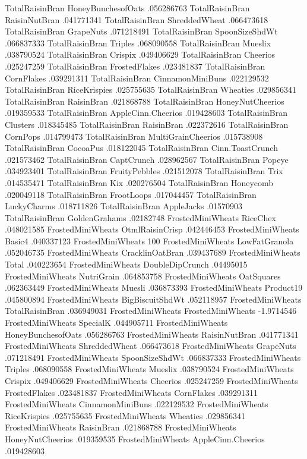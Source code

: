 TotalRaisinBran	HoneyBunchesofOats	.056286763
TotalRaisinBran	RaisinNutBran	.041771341
TotalRaisinBran	ShreddedWheat	.066473618
TotalRaisinBran	GrapeNuts	.071218491
TotalRaisinBran	SpoonSizeShdWt	.066837333
TotalRaisinBran	Triples	.068090558
TotalRaisinBran	Mueslix	.038790524
TotalRaisinBran	Crispix	.049406629
TotalRaisinBran	Cheerios	.025247259
TotalRaisinBran	FrostedFlakes	.023481837
TotalRaisinBran	CornFlakes	.039291311
TotalRaisinBran	CinnamonMiniBuns	.022129532
TotalRaisinBran	RiceKrispies	.025755635
TotalRaisinBran	Wheaties	.029856341
TotalRaisinBran	RaisinBran	.021868788
TotalRaisinBran	HoneyNutCheerios	.019359533
TotalRaisinBran	AppleCinn.Cheerios	.019428603
TotalRaisinBran	Clusters	.018345485
TotalRaisinBran	RaisinBran	.022372616
TotalRaisinBran	CornPops	.014799473
TotalRaisinBran	MultiGrainCheerios	.015738908
TotalRaisinBran	CocoaPus	.018122045
TotalRaisinBran	Cinn.ToastCrunch	.021573462
TotalRaisinBran	CaptCrunch	.028962567
TotalRaisinBran	Popeye	.034923401
TotalRaisinBran	FruityPebbles	.021512078
TotalRaisinBran	Trix	.014535471
TotalRaisinBran	Kix	.020276504
TotalRaisinBran	Honeycomb	.020049118
TotalRaisinBran	FrootLoops	.017044457
TotalRaisinBran	LuckyCharms	.018711826
TotalRaisinBran	AppleJacks	.01570903
TotalRaisinBran	GoldenGrahams	.02182748
FrostedMiniWheats	RiceChex	.048021585
FrostedMiniWheats	OtmlRaisinCrisp	.042446453
FrostedMiniWheats	Basic4	.040337123
FrostedMiniWheats	100%
FrostedMiniWheats	LowFatGranola	.052046735
FrostedMiniWheats	CracklinOatBran	.039437689
FrostedMiniWheats	Total	.040223654
FrostedMiniWheats	DoubleDipCrunch	.04495015
FrostedMiniWheats	NutriGrain	.064853758
FrostedMiniWheats	OatSquares	.062363449
FrostedMiniWheats	Muesli	.036873393
FrostedMiniWheats	Product19	.045800894
FrostedMiniWheats	BigBiscuitShdWt	.052118957
FrostedMiniWheats	TotalRaisinBran	.036949031
FrostedMiniWheats	FrostedMiniWheats	-1.9714546
FrostedMiniWheats	SpecialK	.044905711
FrostedMiniWheats	HoneyBunchesofOats	.056286763
FrostedMiniWheats	RaisinNutBran	.041771341
FrostedMiniWheats	ShreddedWheat	.066473618
FrostedMiniWheats	GrapeNuts	.071218491
FrostedMiniWheats	SpoonSizeShdWt	.066837333
FrostedMiniWheats	Triples	.068090558
FrostedMiniWheats	Mueslix	.038790524
FrostedMiniWheats	Crispix	.049406629
FrostedMiniWheats	Cheerios	.025247259
FrostedMiniWheats	FrostedFlakes	.023481837
FrostedMiniWheats	CornFlakes	.039291311
FrostedMiniWheats	CinnamonMiniBuns	.022129532
FrostedMiniWheats	RiceKrispies	.025755635
FrostedMiniWheats	Wheaties	.029856341
FrostedMiniWheats	RaisinBran	.021868788
FrostedMiniWheats	HoneyNutCheerios	.019359535
FrostedMiniWheats	AppleCinn.Cheerios	.019428603
